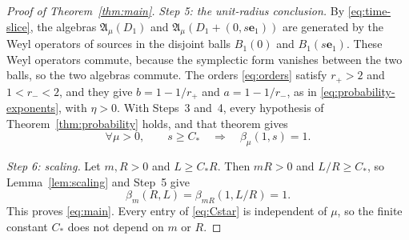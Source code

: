 \documentclass[11pt]{amsart}
\numberwithin{equation}{section}
\theoremstyle{definition}
\newcommand{\A}{\mathfrak A}
\newcommand{\eone}{\mathbf e_1}
\begin{document}
\begin{proof}[Proof of Theorem~\ref{thm:main}]
\smallskip
\emph{Step 5: the unit-radius conclusion.} By \eqref{eq:time-slice},
the algebras \(\A_\mu(D_1)\) and \(\A_\mu(D_1+(0,s\eone))\) are
generated by the Weyl operators of sources in the disjoint balls
\(B_1(0)\) and \(B_1(s\eone)\). These Weyl operators commute, because
the symplectic form vanishes between the two balls, so the two
algebras commute. The orders \eqref{eq:orders} satisfy \(r_+>2\) and
\(1<r_-<2\), and they give \(b=1-1/r_+\) and \(a=1-1/r_-\), as in
\eqref{eq:probability-exponents}, with \(\eta>0\). With Steps~3
and~4, every hypothesis of Theorem~\ref{thm:probability} holds, and
that theorem gives
\[
 \forall\mu>0,\qquad
 s\ge C_*\quad\Longrightarrow\quad\beta_\mu(1,s)=1.
\]

\smallskip
\emph{Step 6: scaling.} Let \(m,R>0\) and \(L\ge C_*R\). Then \(mR>0\)
and \(L/R\ge C_*\), so Lemma~\ref{lem:scaling} and Step~5 give
\[
 \beta_m(R,L)=\beta_{mR}(1,L/R)=1.
\]
This proves \eqref{eq:main}. Every entry of \eqref{eq:Cstar} is
independent of \(\mu\), so the finite constant \(C_*\) does not depend
on \(m\) or \(R\).
\end{proof}
\end{document}
